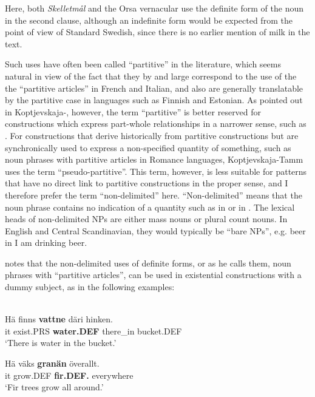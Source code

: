 Here, both \textit{Skelletmål} and the Orsa vernacular use the definite form of the noun  in the second clause, although an indefinite form would be expected from the point of view of Standard Swedish, since there is no earlier mention of milk in the text. 

Such uses have often been called “partitive” in the literature, which seems natural in view of the fact that they by and large correspond to the use of the the “partitive articles” in French and Italian, and also are generally translatable by the partitive case in languages such as Finnish and Estonian. As pointed out in Koptjevskaja-\citet[525]{Tamm2001}, however, the term “partitive” is better reserved for constructions which express part-whole relationships in a narrower sense, such as . For constructions that derive historically from partitive constructions but are synchronically used to express a non-specified quantity of something, such as noun phrases with partitive articles in Romance languages, Koptjevskaja-Tamm uses the term “pseudo-partitive”. This term, however, is less suitable for patterns that have no direct link to partitive constructions in the proper sense, and I therefore prefer the term “non-delimited” here. “Non-delimited” means that the noun phrase contains no indication of a quantity such as  in or  in . The lexical heads of non-delimited NPs are either mass nouns or plural count nouns. In English and Central Scandinavian, they would typically be “bare NPs”, e.g. beer in I am drinking beer. 

\citet[51]{Delsing1993} notes that the non-delimited uses of definite forms, or as he calls them, noun phrases with “partitive articles”, can be used in existential constructions with a dummy subject, as in the following examples: 

\ea\label{}
\\
\gll 	Hä  finns  \textbf{vattne} däri  hinken.\\
		it  exist.PRS  \textbf{water.DEF} there\_in  bucket.DEF\\
\glt 	‘There is water in the bucket.’

\z

\ea
\gll 	Hä  väks  \textbf{granän} överallt.\\
		it  grow.DEF  \textbf{fir.DEF.} everywhere\\
\glt 	‘Fir trees grow all around.’
\z

